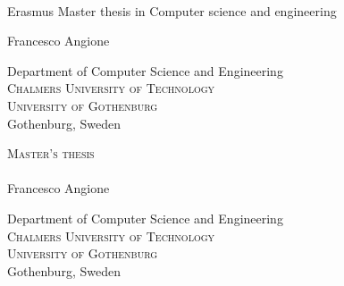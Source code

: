 \begin{titlepage}
\textbf{\Huge  \multiLineTitle{0.2cm}}\\[0.5cm]



Erasmus Master thesis in Computer science and engineering \setlength{\parskip}{1cm}

{\Large Francesco Angione} \setlength{\parskip}{2.9cm}

Department of Computer Science and Engineering \\
\textsc{Chalmers University of Technology} \\
\textsc{University of Gothenburg} \\
Gothenburg, Sweden \the\year

\renewcommand{\familydefault}{\rmdefault} \normalfont %
\end{titlepage}


\newpage
\restoregeometry
\thispagestyle{empty}
\mbox{}


\newpage
\thispagestyle{empty}
\begin{center}
	\textsc{\large Master's thesis \the\year}\\[4cm]		%
	\textbf{\Large \multiLineTitle{0.2cm}} \\[1cm]
	{\large Francesco Angione}
	
	\vfill	
	\begin{figure}[H]
	\centering
	\end{figure}	\vspace{5mm}	
	
	Department of Computer Science and Engineering\\
	\textsc{Chalmers University of Technology} \\
	\textsc{University of Gothenburg} \\
	Gothenburg, Sweden \the\year \\
\end{center}


